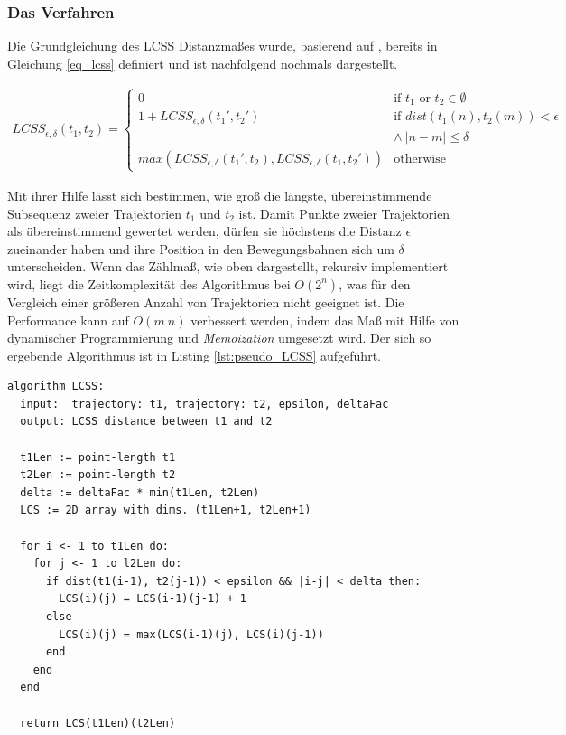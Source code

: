 \subsubsection{Das Verfahren}

Die Grundgleichung des LCSS Distanzmaßes wurde, basierend auf \cite[]{Vlachos2002}, bereits in Gleichung
\ref{eq_lcss} definiert und ist nachfolgend nochmals dargestellt.

\begin{ceqn}
\begin{align*}
    LCSS_{\epsilon, \delta}(t_1, t_2) =
    \begin{cases}
        0 & \text{if } t_1 \text{ or } t_2 \in \emptyset \\
        1 + LCSS_{\epsilon, \delta}(t_1', t_2') & \text{if } dist(t_1(n), t_2(m)) < \epsilon \\
        & \land\ |n - m| \leq \delta \\
        max(LCSS_{\epsilon, \delta}(t_1', t_2), LCSS_{\epsilon, \delta}(t_1, t_2')) & \text{otherwise}
    \end{cases}
\end{align*}
\end{ceqn}

Mit ihrer Hilfe lässt sich bestimmen, wie groß die längste, übereinstimmende Subsequenz zweier Trajektorien
$t_1$ und $t_2$ ist. Damit Punkte zweier Trajektorien als übereinstimmend gewertet werden, dürfen sie
höchstens die Distanz $\epsilon$ zueinander haben und ihre Position in den Bewegungsbahnen sich um $\delta$
unterscheiden.
Wenn das Zählmaß, wie oben dargestellt, rekursiv implementiert wird, liegt die Zeitkomplexität des Algorithmus
bei $O(2^n)$, was für den Vergleich einer größeren Anzahl von Trajektorien nicht geeignet ist. Die Performance
kann auf $O(m\ n)$ verbessert werden, indem das Maß mit Hilfe von dynamischer Programmierung und \textit{Memoization}
umgesetzt wird. Der sich so ergebende Algorithmus ist in Listing \ref{lst:pseudo_LCSS} aufgeführt.
\begin{lstlisting}[caption=Pseudocode LCSS Bestimmung, language=Pseudo, label=lst:pseudo_LCSS] 
algorithm LCSS:
  input:  trajectory: t1, trajectory: t2, epsilon, deltaFac
  output: LCSS distance between t1 and t2

  t1Len := point-length t1
  t2Len := point-length t2
  delta := deltaFac * min(t1Len, t2Len)
  LCS := 2D array with dims. (t1Len+1, t2Len+1)

  for i <- 1 to t1Len do:
    for j <- 1 to l2Len do:
      if dist(t1(i-1), t2(j-1)) < epsilon && |i-j| < delta then:
        LCS(i)(j) = LCS(i-1)(j-1) + 1
      else
        LCS(i)(j) = max(LCS(i-1)(j), LCS(i)(j-1))
      end
    end
  end

  return LCS(t1Len)(t2Len)
\end{lstlisting}

